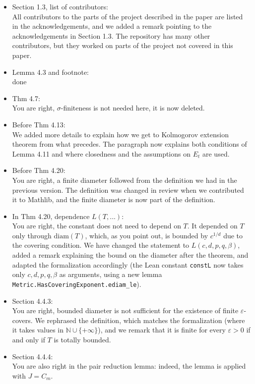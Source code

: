 \documentclass[11pt]{article}
\begin{document}
\begin{itemize}
  \item Section 1.3, list of contributors: \\{\color{blue}All contributors to the parts of the project described in the paper are listed in the acknowledgements, and we added a remark pointing to the acknowledgements in Section 1.3. The repository has many other contributors, but they worked on parts of the project not covered in this paper.}
  \item Lemma 4.3 and footnote: \\{\color{blue}done}
  \item Thm 4.7: \\{\color{blue}You are right, $\sigma$-finiteness is not needed here, it is now deleted. }
  \item Before Thm 4.13: \\{\color{blue}We added more details to explain how we get to Kolmogorov extension theorem from what precedes. The paragraph now explains both conditions of Lemma 4.11 and where closedness and the assumptions on $E_t$ are used.}
  \item Before Thm 4.20: \\{\color{blue}You are right, a finite diameter followed from the definition we had in the previous version. The definition was changed in review when we contributed it to Mathlib, and the finite diameter is now part of the definition.}
  \item In Thm 4.20, dependence $L(T,...)$: \\{\color{blue}You are right, the constant does not need to depend on $T$. It depended on $T$ only through $\mathrm{diam}(T)$, which, as you point out, is bounded by $c^{1/d}$ due to the covering condition. We have changed the statement to $L(c, d, p, q, \beta)$, added a remark explaining the bound on the diameter after the theorem, and adapted the formalization accordingly (the Lean constant \texttt{constL} now takes only $c, d, p, q, \beta$ as arguments, using a new lemma \texttt{Metric.HasCoveringExponent.ediam\_le}).}
  \item Section 4.4.3: \\{\color{blue}You are right, bounded diameter is not sufficient for the existence of finite $\varepsilon$-covers. We rephrased the definition, which matches the formalization (where it takes values in $\mathbb{N} \cup \{+\infty\}$), and we remark that it is finite for every $\varepsilon > 0$ if and only if $T$ is totally bounded.}
  \item Section 4.4.4: \\ {\color{blue} You are also right in the pair reduction lemma: indeed, the lemma is applied with $J = C_m$.}

\end{itemize}
\end{document}
